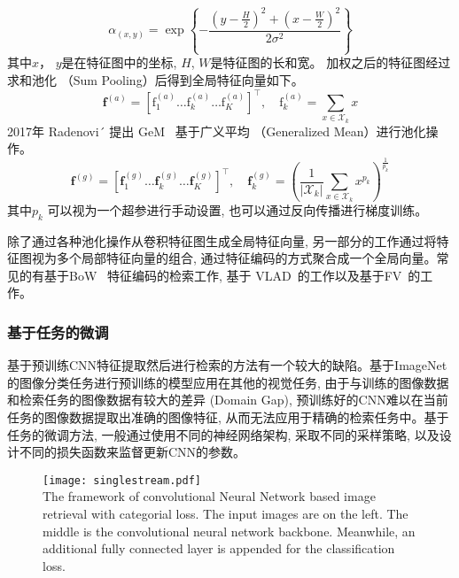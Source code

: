 \begin{equation}
    \alpha_{(x, y)}=\exp \left\{-\frac{\left(y-\frac{H}{2}\right)^2+\left(x-\frac{W}{2}\right)^2}{2 \sigma^2}\right\}
    \label{eq:gaussianweight}
\end{equation}
其中$x$， $y$是在特征图中的坐标, $H$, $W$是特征图的长和宽。 加权之后的特征图经过求和池化 （Sum Pooling）后得到全局特征向量如下。
\begin{equation}
    \mathbf{f}^{(a)}=\left[\mathrm{f}_1^{(a)} \ldots \mathrm{f}_k^{(a)} \ldots \mathrm{f}_K^{(a)}\right]^{\top}, \quad \mathrm{f}_k^{(a)}= \sum_{x \in \mathcal{X}_k} x
\end{equation}
2017年 Radenovi´ 提出 GeM~\cite{radenovic2018fine} 基于广义平均 （Generalized Mean）进行池化操作。
\begin{equation}
    \mathbf{f}^{(g)}=\left[\mathbf{f}_1^{(g)} \ldots \mathbf{f}_k^{(g)} \ldots \mathbf{f}_K^{(g)}\right]^{\top}, \quad \mathbf{f}_k^{(g)}=\left(\frac{1}{\left|\mathcal{X}_k\right|} \sum_{x \in \mathcal{X}_k} x^{p_k}\right)^{\frac{1}{p_k}}
\end{equation}
其中$p_k$ 可以视为一个超参进行手动设置, 也可以通过反向传播进行梯度训练。\par
除了通过各种池化操作从卷积特征图生成全局特征向量, 另一部分的工作通过将特征图视为多个局部特征向量的组合, 通过特征编码的方式聚合成一个全局向量。常见的有基于BoW ~\cite{li2016exploiting, mohedano2016bags, zheng2016accurate}特征编码的检索工作, 基于 VLAD~\cite{gong2014multi, yue2015exploiting}的工作以及基于FV~\cite{jegou2011aggregating, sanchez2013image}的工作。 

\subsubsection{基于任务的微调}
基于预训练CNN特征提取然后进行检索的方法有一个较大的缺陷。基于ImageNet的图像分类任务进行预训练的模型应用在其他的视觉任务, 由于与训练的图像数据和检索任务的图像数据有较大的差异 (Domain Gap), 预训练好的CNN难以在当前任务的图像数据提取出准确的图像特征, 从而无法应用于精确的检索任务中。基于任务的微调方法, 一般通过使用不同的神经网络架构, 采取不同的采样策略, 以及设计不同的损失函数来监督更新CNN的参数。
\begin{figure}[!htp]
    \centering
    \texttt{[image: singlestream.pdf]} \\
      {The framework of convolutional Neural Network based image retrieval with categorial loss. The input images are on the left. The middle is the convolutional neural network backbone. Meanwhile, an additional fully connected layer is appended for the classification loss.  }
   \label{fig:featurestream}
\end{figure}

